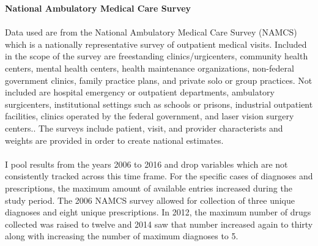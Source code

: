 \noindent \textbf{National Ambulatory Medical Care Survey}\cite{myrick_understanding_nodate}\\
\\
Data used are from the National Ambulatory Medical Care Survey (NAMCS) which is a nationally representative survey of outpatient medical visits. Included in the scope of the survey are freestanding clinics/urgicenters, community health centers, mental health centers, health maintenance organizations,  non-federal government clinics, family practice plans, and private solo or group practices. Not included are hospital emergency or outpatient departments, ambulatory surgicenters, institutional settings such as schools or prisons, industrial outpatient facilities, clinics operated by the federal government, and laser vision surgery centers.\cite{hing_basic_nodate}. The surveys include patient, visit, and provider characterists and weights are provided in order to create national estimates.\\
\\
I pool results from the years 2006 to 2016 and drop variables which are not consistently tracked across this time frame. For the specific cases of diagnoses and prescriptions, the maximum amount of available entries increased during the study period. The 2006 NAMCS survey allowed for collection of three unique diagnoses and eight unique prescriptions. In 2012, the maximum number of drugs collected was raised to twelve and 2014 saw that number increased again to thirty along with increasing the number of maximum diagnoses to 5. 

\newpage
 







%
%

